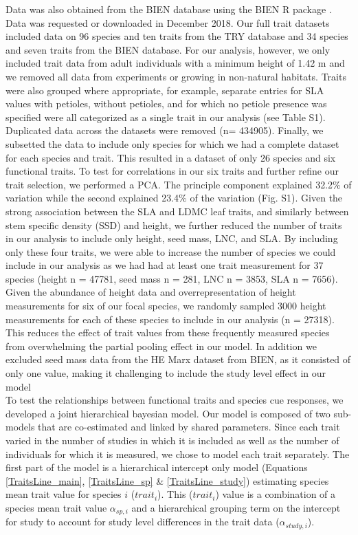 \documentclass{article}\usepackage[]{graphicx}\usepackage[]{color}
\begin{document}
Data was also obtained from the BIEN database using the BIEN R package \citep{Maitner2017}. Data was requested or downloaded in December 2018. Our full trait datasets included data on 96 species and ten traits from the TRY database and 34 species and seven traits from the BIEN database. For our analysis, however, we only included trait data from adult individuals with a minimum height of 1.42 m and we removed all data from experiments or growing in non-natural habitats. Traits were also grouped where appropriate, for example, separate entries for SLA values with petioles, without petioles, and for which no petiole presence was specified were all categorized as a single trait in our analysis (see Table S1). Duplicated data across the datasets were removed (n= 434905). Finally, we subsetted the data to include only species for which we had a complete dataset for each species and trait. This resulted in a dataset of only 26 species and six functional traits. To test for correlations in our six traits and further refine our trait selection, we performed a PCA. The principle component explained 32.2\% of variation while the second explained 23.4\% of the variation (Fig. S1). Given the strong association between the SLA and LDMC leaf traits, and similarly between stem specific density (SSD) and height, we further reduced the number of traits in our analysis to include only height, seed mass, LNC, and SLA. By including only these four traits, we were able to increase the number of species we could include in our analysis as we had had at least one trait measurement for 37 species (height n = 47781, seed mass n = 281, LNC n = 3853, SLA n = 7656). Given the abundance of height data and overrepresentation of height measurements for six of our focal species, we randomly sampled 3000 height measurements for each of these species to include in our analysis (n = 27318). This reduces the effect of trait values from these frequently measured species from overwhelming the partial pooling effect in our model. In addition we excluded seed mass data from the HE Marx dataset from BIEN, as it consisted of only one value, making it challenging to include the study level effect in our model\\ 

To test the relationships between functional traits and species cue responses, we developed a joint hierarchical bayesian model. Our model is composed of two sub-models that are co-estimated and linked by shared parameters. Since each trait varied in the number of studies in which it is included as well as the number of individuals for which it is measured, we chose to model each trait separately. The first part of the model is a hierarchical intercept only model (Equations \ref{TraitsLine_main}, \ref{TraitsLine_sp} \& \ref{TraitsLine_study}) estimating species mean trait value for species $i$ ($trait_{i}$). This ($trait_{i}$) value is a combination of a species mean trait value $\alpha_{sp,i}$ and a hierarchical grouping term on the intercept for study to account for study level differences in the trait data ($\alpha_{study,i}$).  \\
\end{document}

